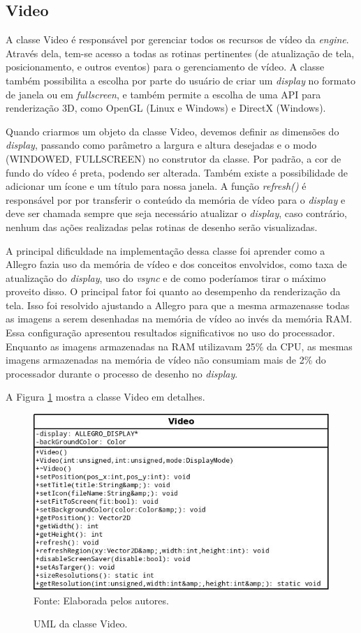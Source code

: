 \subsection{Video}
%
%
A classe Video é responsável por gerenciar todos os recursos de vídeo da \textit{engine}. Através dela, tem-se acesso a todas as rotinas pertinentes (de atualização de tela, posicionamento, e outros eventos) para o gerenciamento de vídeo. A classe também possibilita a escolha por parte do usuário de criar um \textit{display} no formato de janela ou em \textit{fullscreen}, e também permite a escolha de uma API para renderização 3D, como OpenGL (Linux e Windows) e DirectX (Windows). 
\par 
Quando criarmos um objeto da classe Video, devemos definir as dimensões do \textit{display}, passando como parâmetro a largura e altura desejadas e o modo (WINDOWED, FULLSCREEN) no construtor da classe. Por padrão, a cor de fundo do vídeo é preta, podendo ser alterada. Também existe a possibilidade de adicionar um ícone e um título para nossa janela. A função \textit{refresh()} é responsável por por transferir o conteúdo da memória de vídeo para o \textit{display} e deve ser chamada sempre que seja necessário atualizar o \textit{display}, caso contrário, nenhum das ações realizadas pelas rotinas de desenho serão visualizadas. 
\par 
A principal dificuldade na implementação dessa classe foi aprender como a Allegro fazia uso da memória de vídeo e dos conceitos envolvidos, como taxa de atualização do \textit{display}, uso do \textit{vsync} e de como poderíamos tirar o máximo proveito disso. O principal fator foi quanto ao desempenho da renderização da tela. Isso foi resolvido ajustando a Allegro para que a mesma armazenasse todas as imagens a serem desenhadas na memória de vídeo ao invés da memória RAM. Essa configuração apresentou resultados significativos no uso do processador. Enquanto as imagens armazenadas na RAM utilizavam 25\% da CPU, as mesmas imagens armazenadas na memória de vídeo não consumiam mais de 2\% do processador durante o processo de desenho no \textit{display}.
\par
A Figura \ref{umlVideo} mostra a classe Video em detalhes.
%
%
%
%
\begin{figure}[H]
    \centering
    \caption{UML da classe Video.}
    \label{umlVideo}
    \includegraphics[scale = 0.5]{uml/video.jpeg}
    \\Fonte: Elaborada pelos autores.
\end{figure}

